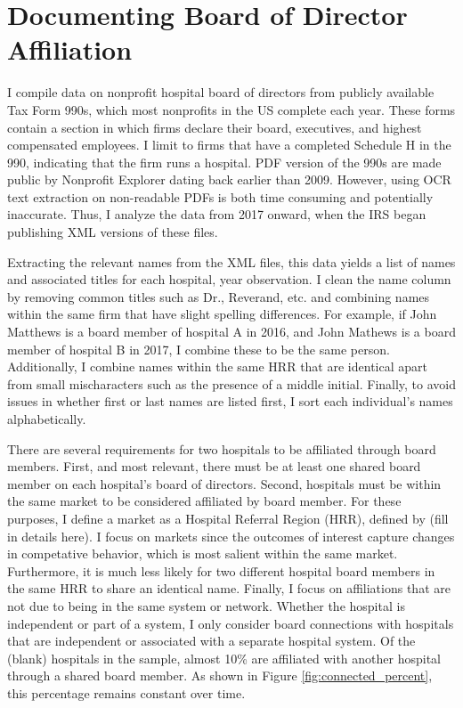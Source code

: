 \documentclass[12pt]{article}
\begin{document}
    \section{Documenting Board of Director Affiliation}

    I compile data on nonprofit hospital board of directors from publicly available Tax Form 990s, which most nonprofits in the US complete each year. These forms contain a section in which firms declare their board, executives, and highest compensated employees. I limit to firms that have a completed Schedule H in the 990, indicating that the firm runs a hospital. PDF version of the 990s are made public by Nonprofit Explorer dating back earlier than 2009. However, using OCR text extraction on non-readable PDFs is both time consuming and potentially inaccurate. Thus, I analyze the data from 2017 onward, when the IRS began publishing XML versions of these files. 

    Extracting the relevant names from the XML files, this data yields a list of names and associated titles for each hospital, year observation. I clean the name column by removing common titles such as Dr., Reverand, etc. and combining names within the same firm that have slight spelling differences. For example, if John Matthews is a board member of hospital A in 2016, and John Mathews is a board member of hospital B in 2017, I combine these to be the same person. Additionally, I combine names within the same HRR that are identical apart from small mischaracters such as the presence of a middle initial. Finally, to avoid issues in whether first or last names are listed first, I sort each individual's names alphabetically. 

    There are several requirements for two hospitals to be affiliated through board members. First, and most relevant, there must be at least one shared board member on each hospital's board of directors. Second, hospitals must be within the same market to be considered affiliated by board member. For these purposes, I define a market as a Hospital Referral Region (HRR), defined by (fill in details here). I focus on markets since the outcomes of interest capture changes in competative behavior, which is most salient within the same market. Furthermore, it is much less likely for two different hospital board members in the same HRR to share an identical name. Finally, I focus on affiliations that are not due to being in the same system or network. Whether the hospital is independent or part of a system, I only consider board connections with hospitals that are independent or associated with a separate hospital system. Of the (blank) hospitals in the sample, almost 10\% are affiliated with another hospital through a shared board member. As shown in Figure \ref{fig:connected_percent}, this percentage remains constant over time. 
\end{document}
